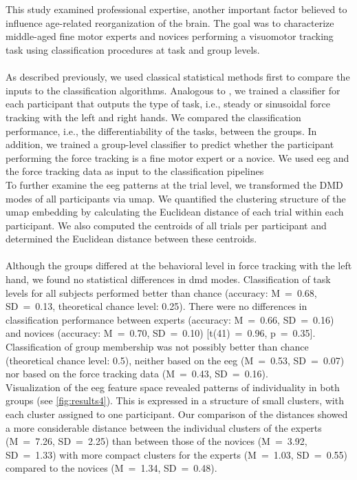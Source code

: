 \hyperref[pub:paperIV]{}\\
\\
This study examined professional expertise, another important factor believed to influence age-related reorganization of the brain. The goal was to characterize middle-aged fine motor experts and novices performing a visuomotor tracking task using classification procedures at task and group levels.\\
\\
As described previously, we used classical statistical methods first to compare the inputs to the classification algorithms. Analogous to , we trained a classifier for each participant that outputs the type of task, i.e., steady or sinusoidal force tracking with the left and right hands. We compared the classification performance, i.e., the differentiability of the tasks, between the groups. In addition, we trained a group-level classifier to predict whether the participant performing the force tracking is a fine motor expert or a novice. We used \gls{eeg} and the force tracking data as input to the classification pipelines\\
To further examine the \gls{eeg} patterns at the trial level, we transformed the DMD modes of all participants via \gls{umap}. We quantified the clustering structure of the \gls{umap} embedding by calculating the Euclidean distance of each trial within each participant. We also computed the centroids of all trials per participant and determined the Euclidean distance between these centroids.\\
\\
Although the groups differed at the behavioral level in force tracking with the left hand, we found no statistical differences in \gls{dmd} modes. Classification of task levels for all subjects performed better than chance (accuracy: M~=~0.68, SD~=~0.13, theoretical chance level: 0.25). There were no differences in classification performance between experts (accuracy: M~=~0.66, SD~=~0.16) and novices (accuracy: M~=~0.70, SD~=~0.10) [t(41)~=~0.96, p~=~0.35].\\
Classification of group membership was not possibly better than chance (theoretical chance level: 0.5), neither based on the \gls{eeg} (M~=~0.53, SD~=~0.07) nor based on the force tracking data (M~=~0.43, SD~=~0.16).\\
Visualization of the \gls{eeg} feature space revealed patterns of individuality in both groups (see \autoref{fig:results4}). This is expressed in a structure of small clusters, with each cluster assigned to one participant. Our comparison of the distances showed a more considerable distance between the individual clusters of the experts (M~=~7.26, SD~=~2.25) than between those of the novices (M~=~3.92, SD~=~1.33) with more compact clusters for the experts (M~=~1.03, SD~=~0.55) compared to the novices (M~=~1.34, SD~=~0.48).\\

